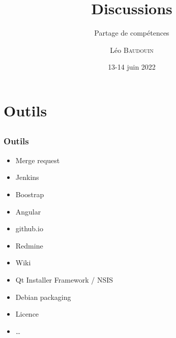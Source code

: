 \documentclass{beamer}
\title{Discussions}
\subtitle{Partage de compétences}
\author{L\'eo \textsc{Baudouin}}
\institute{
  {\url{baudouin.leo @ gmail.com}}
}
\date{13-14 juin 2022}
\begin{document}
\begin{frame}
  \titlepage
\end{frame}




\section{Outils}
\subsection{}

\begin{frame}
  \frametitle{Outils}
  \begin{block}{}
  \begin{itemize}[<+->]
  \item Merge request
  \item Jenkins
  \item Boostrap
  \item Angular
  \item github.io
  \item Redmine
  \item Wiki
  \item Qt Installer Framework / NSIS
  \item Debian packaging
  \item Licence
  \item \dots
  \end{itemize}
  \end{block}  
\end{frame}

\end{document}
